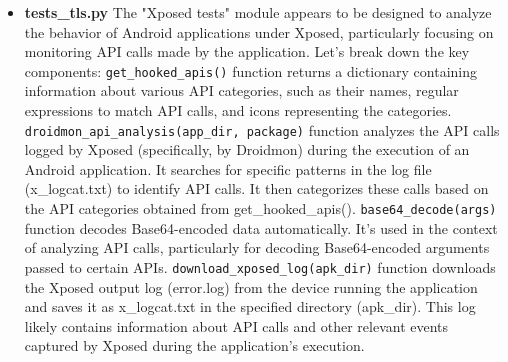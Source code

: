 \documentclass{report}
\begin{document}
\begin{itemize}
\begin{itemize}
        \item \textbf {tests\_tls.py}
        The "Xposed tests" module appears to be designed to analyze the behavior of Android applications under Xposed, particularly focusing on monitoring API calls made by the application. Let's break down the key components: \newline
        \texttt{get\_hooked\_apis()} function returns a dictionary containing information about various API categories, such as their names, regular expressions to match API calls, and icons representing the categories. \newline
        \texttt{droidmon\_api\_analysis(app\_dir, package)} function analyzes the API calls logged by Xposed (specifically, by Droidmon) during the execution of an Android application. It searches for specific patterns in the log file (x\_logcat.txt) to identify API calls. It then categorizes these calls based on the API categories obtained from get\_hooked\_apis(). \newline
        \texttt{base64\_decode(args)} function decodes Base64-encoded data automatically. It's used in the context of analyzing API calls, particularly for decoding Base64-encoded arguments passed to certain APIs.\newline
        \texttt{download\_xposed\_log(apk\_dir)} function downloads the Xposed output log (error.log) from the device running the application and saves it as x\_logcat.txt in the specified directory (apk\_dir). This log likely contains information about API calls and other relevant events captured by Xposed during the application's execution.
       

\end{itemize}
\end{itemize}
\end{document}
